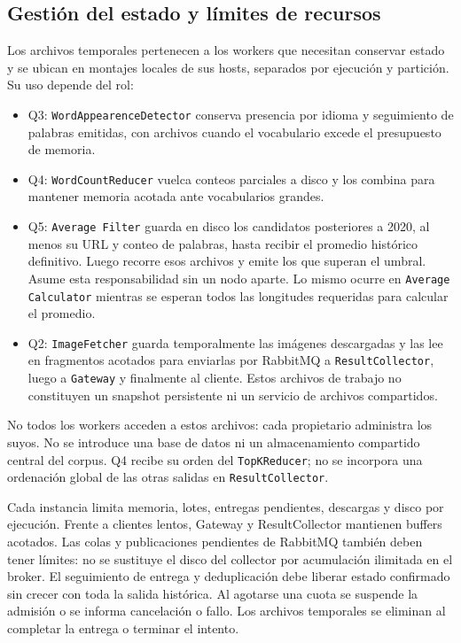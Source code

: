 \subsection{Gestión del estado y límites de recursos}
\label{subsec:estado-recursos}
Los archivos temporales pertenecen a los workers que necesitan conservar
estado y se ubican en montajes locales de sus hosts, separados por ejecución
y partición. Su uso depende del rol:
\begin{itemize}
    \item Q3: \texttt{WordAppearenceDetector} conserva presencia por idioma y
    seguimiento de palabras emitidas, con archivos cuando el vocabulario
    excede el presupuesto de memoria.
    \item Q4: \texttt{WordCountReducer} vuelca conteos parciales a disco y los
    combina para mantener memoria acotada ante vocabularios grandes.
    \item Q5: \texttt{Average Filter} guarda en disco los candidatos posteriores
    a 2020, al menos su URL y conteo de palabras, hasta recibir el promedio
    histórico definitivo. Luego recorre esos archivos y emite los que superan
    el umbral. Asume esta responsabilidad sin un nodo aparte. Lo mismo ocurre en \texttt{Average Calculator} mientras se esperan todos las longitudes requeridas para calcular el promedio.
    \item Q2: \texttt{ImageFetcher} guarda temporalmente las imágenes descargadas
    y las lee en fragmentos acotados para enviarlas por RabbitMQ a
    \texttt{ResultCollector}, luego a \texttt{Gateway} y finalmente al cliente.
    Estos archivos de trabajo no constituyen un snapshot
    persistente ni un servicio de archivos compartidos.
\end{itemize}
No todos los workers acceden a estos archivos: cada propietario administra
los suyos. No se introduce una base de datos ni un almacenamiento compartido
central del corpus. Q4 recibe su orden del \texttt{TopKReducer}; no se incorpora
una ordenación global de las otras salidas en \texttt{ResultCollector}.

Cada instancia limita memoria, lotes, entregas pendientes, descargas y disco
por ejecución. Frente a clientes lentos, Gateway y ResultCollector mantienen
buffers acotados. Las colas y publicaciones pendientes de RabbitMQ también
deben tener límites: no se sustituye el disco del collector por acumulación
ilimitada en el broker. El seguimiento de entrega y deduplicación debe liberar
estado confirmado sin crecer con toda la salida histórica.
Al agotarse una cuota se suspende la admisión o se informa cancelación o fallo.
Los archivos temporales se eliminan al completar la entrega o terminar el intento.

